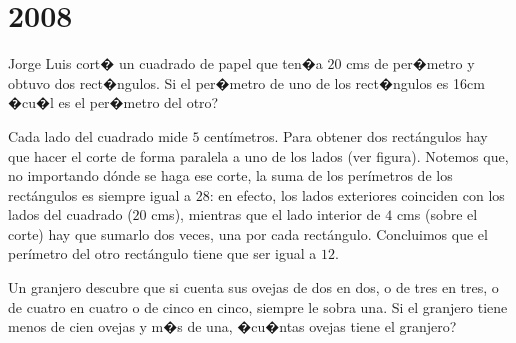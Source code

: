\chapter{2008}
\label{cha:2008}

\begin{Problema}{1}
  Jorge Luis cort� un cuadrado de papel que ten�a $20$ cms de per�metro y
  obtuvo dos rect�ngulos. Si el per�metro de uno de los rect�ngulos es
  16cm �cu�l es el per�metro del otro?
\end{Problema}

\begin{Solucion}
  Cada lado del cuadrado mide $5$ cent\'imetros. Para obtener dos rect\'angulos
hay que hacer el corte de forma paralela a uno de los lados (ver figura). Notemos que, no importando d\'onde
se haga ese corte, la suma de los per\'imetros de los rect\'angulos es siempre igual a $28$: en efecto,
los lados exteriores coinciden con los lados del cuadrado ($20$ cms), mientras que el lado interior de $4$ cms (sobre
el corte) hay que sumarlo dos veces, una por cada rect\'angulo. Concluimos que el per\'imetro del otro rect\'angulo
tiene que ser igual a $12$.
\end{Solucion}

\begin{Problema}{2}
  Un granjero descubre que si cuenta sus ovejas de dos en dos, o de
  tres en tres, o de cuatro en cuatro o de cinco en cinco, siempre le
  sobra una. Si el granjero tiene menos de cien ovejas y m�s de una,
  �cu�ntas ovejas tiene el granjero?
\end{Problema}

